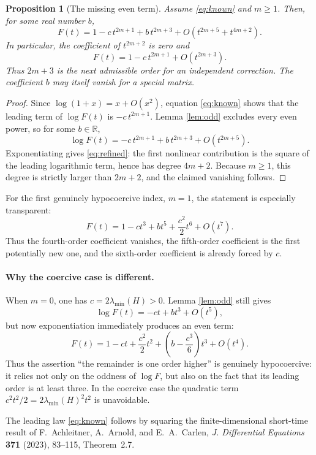\documentclass[11pt,a4paper]{article}
\newtheorem{proposition}{Proposition}
\begin{document}
\begin{proposition}[The missing even term]\label{prop:main}
Assume \eqref{eq:known} and $m\geq1$.  Then, for some real number $b$,
\begin{equation}\label{eq:refined}
F(t)=1-c\,t^{2m+1}+b\,t^{2m+3}
+O\!\left(t^{2m+5}+t^{4m+2}\right).
\end{equation}
In particular, the coefficient of $t^{2m+2}$ is zero and
\[
F(t)=1-c\,t^{2m+1}+O(t^{2m+3}).
\]
Thus $2m+3$ is the next \emph{admissible} order for an independent
correction.  The coefficient $b$ may itself vanish for a special matrix.
\end{proposition}

\begin{proof}
Since $\log(1+x)=x+O(x^2)$, equation \eqref{eq:known} shows that the leading
term of $\log F(t)$ is $-c\,t^{2m+1}$.  Lemma \ref{lem:odd} excludes every even
power, so for some $b\in\mathbb R$,
\[
\log F(t)=-c\,t^{2m+1}+b\,t^{2m+3}+O(t^{2m+5}).
\]
Exponentiating gives \eqref{eq:refined}: the first nonlinear contribution is
the square of the leading logarithmic term, hence has degree $4m+2$.  Because
$m\geq1$, this degree is strictly larger than $2m+2$, and the claimed
vanishing follows.
\end{proof}

For the first genuinely hypocoercive index, $m=1$, the statement is especially
transparent:
\[
F(t)=1-ct^3+bt^5+\frac{c^2}{2}t^6+O(t^7).
\]
Thus the fourth-order coefficient vanishes, the fifth-order coefficient is the
first potentially new one, and the sixth-order coefficient is already forced by $c$.

\paragraph{Why the coercive case is different.}
When $m=0$, one has $c=2\lambda_{\min}(H)>0$.  Lemma \ref{lem:odd} still gives
\[
\log F(t)=-ct+b t^3+O(t^5),
\]
but now exponentiation immediately produces an even term:
\begin{equation}\label{eq:coercive}
F(t)=1-ct+\frac{c^2}{2}t^2
+\left(b-\frac{c^3}{6}\right)t^3+O(t^4).
\end{equation}
Thus the assertion ``the remainder is one order higher'' is genuinely
hypocoercive: it relies not only on the oddness of $\log F$, but also on the
fact that its leading order is at least three.  In the coercive case the
quadratic term $c^2t^2/2=2\lambda_{\min}(H)^2t^2$ is unavoidable.

\vfill
\footnotesize
The leading law \eqref{eq:known} follows by squaring the finite-dimensional
short-time result of F.~Achleitner, A.~Arnold, and E.~A.~Carlen,
\emph{J. Differential Equations} \textbf{371} (2023), 83--115, Theorem~2.7.
\end{document}

